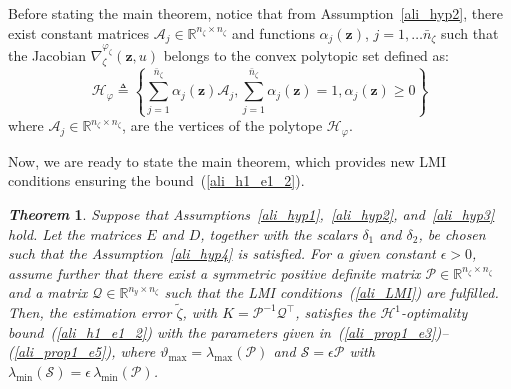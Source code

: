 \documentclass{ifacconf}
\def\eqref#1{(\ref{#1})}
\newtheorem{theorem}{\it \textbf{Theorem}}%
\begin{document}
%
Before stating the main theorem, notice that from Assumption~\ref{ali_hyp2}, there exist constant matrices $\mathcal{A}_{j} \in \mathbb{R}^{n_\zeta \times n_\zeta}$ and functions $\alpha_{j}(\bm{z})$, $j=1,\dots \bar{n}_{\zeta}$ such that the Jacobian $\nabla^{\varphi_{\zeta}}_{\zeta}(\bm{z},u)$ belongs to the convex polytopic set defined as:
\begin{equation}\label{varphi_zeta}
\mathcal{H}_{\varphi} \triangleq \left\{ \sum^{\bar{n}_{\zeta}}_{j=1}\alpha_{j} (\bm{z}) \mathcal{A}_{j}, \sum^{\bar{n}_{\zeta}}_{j=1}\alpha_{j}(\bm{z}) =1, \alpha_{j}(\bm{z}) \geq0 \right\}
\end{equation}
where $\mathcal{A}_{j} \in \mathbb{R}^{n_\zeta \times n_\zeta}$, are the vertices of the polytope $\mathcal{H}_{\varphi}$. 

Now, we are ready to state the main theorem, which provides new LMI conditions ensuring the bound~\eqref{ali_h1_e1_2}.

\begin{theorem}\label{ali_thm}
Suppose that Assumptions~\ref{ali_hyp1},~\ref{ali_hyp2}, and~\ref{ali_hyp3} hold. Let the matrices $E$ and $D$, together with the scalars $\delta_1$ and $\delta_2$, be chosen such that the Assumption~\ref{ali_hyp4} is satisfied. For a given constant $\epsilon > 0$, assume further that there exist a symmetric positive definite matrix $\mathcal{P} \in \mathbb{R}^{n_{\zeta}\times n_{\zeta}}$ and a matrix $\mathcal{Q} \in \mathbb{R}^{n_{y}\times n_{\zeta}}$ such that the LMI conditions~\eqref{ali_LMI} are fulfilled. Then, the estimation error $\tilde{\zeta}$, with $K = \mathcal{P}^{-1}\mathcal{Q}^{\top}$, satisfies the $\mathcal{H}^{1}$-optimality bound~\eqref{ali_h1_e1_2} with the parameters given in~\eqref{ali_prop1_e3}--\eqref{ali_prop1_e5}, where $\vartheta_{\max} = \lambda_{\max}\!\left( \mathcal{P} \right)$ and $\mathcal{S} = \epsilon \mathcal{P}$ with $\lambda_{\min}\!\left( \mathcal{S} \right)= \epsilon\, \lambda_{\min}\!\left( \mathcal{P} \right)$.
\end{theorem}
\end{document}
